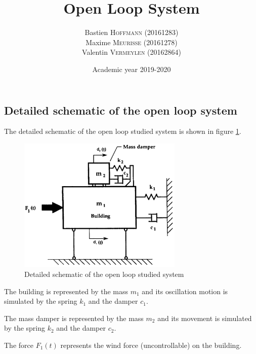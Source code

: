 \documentclass[a4paper, 12pt]{article}
\title{Open Loop System}
\author{
    Bastien \textsc{Hoffmann} (20161283)\\
    Maxime \textsc{Meurisse} (20161278)\\
    Valentin \textsc{Vermeylen} (20162864)\\
}
\date{Academic year 2019-2020}
\begin{document}
    
    
    \subsection{Detailed schematic of the open loop system}
    The detailed schematic of the open loop studied system is shown in figure \ref{fig:detailed_schematic}.
    \begin{figure}[H]
        \centering
        \includegraphics[width=0.7\textwidth]{resources/pdf/schema-without-controller.pdf}
        \caption{Detailed schematic of the open loop studied system \cite{science_direct}}
        \label{fig:detailed_schematic}
    \end{figure}
    The building is represented by the mass $m_1$ and its oscillation motion is simulated by the spring $k_1$ and the damper $c_1$.\par
    The mass damper is represented by the mass $m_2$ and its movement is simulated by the spring $k_2$ and the damper $c_2$.\par
    The force $F_1(t)$ represents the wind force (uncontrollable) on the building.
    
\end{document}
